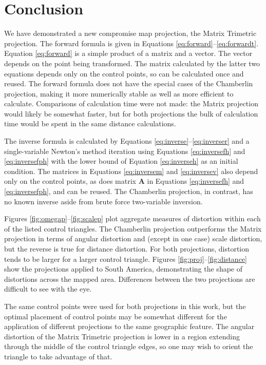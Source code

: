 \documentclass[]{interact}
\begin{document}
\section{Conclusion}
We have demonstrated a new compromise map projection, the Matrix Trimetric
projection. The forward formula is given in Equations
\ref{eq:forward}--\ref{eq:forwardt}. Equation \ref{eq:forward} is a simple
product of a matrix and a vector. The vector depends on the point being
transformed. The matrix calculated by the latter two equations depends only on
the control points, so can be calculated once and reused. The forward formula
does not have the special cases of the Chamberlin projection,
making it more numerically stable as well as more efficient to calculate.
Comparisons of calculation time were not made:
the Matrix projection would likely be somewhat faster, but for both projections
the bulk of calculation time would be spent in the same distance calculations.

The inverse formula is calculated by Equations
\ref{eq:inverse}--\ref{eq:inverser} and a single-variable
Newton's method iteration using Equations \ref{eq:inversefh} and
\ref{eq:inversefph} with the lower bound of Equation \ref{eq:inverseh} as an
initial condition. The matrices in Equations \ref{eq:inversem} and
\ref{eq:inversev} also depend only on the control points, as does matrix
$\mathbf A$ in Equations \ref{eq:inversefh} and \ref{eq:inversefph},
and can be reused. The Chamberlin projection,
in contrast, has no known inverse aside from brute force two-variable inversion.

Figures \ref{fig:omegap}--\ref{fig:scalep} plot aggregate measures of distortion
within each of the listed control triangles. The Chamberlin projection
outperforms the Matrix projection in terms of angular distortion and (except in
one case) scale distortion, but the reverse is true for distance distortion. For
both projections, distortion tends to be larger for a larger control triangle.
Figures \ref{fig:proj}--\ref{fig:distance} show the projections applied to 
South America, demonstrating the shape of distortions across the mapped area.
Differences between the two projections are difficult to see with the eye.

The same control points were used for both projections in this work, but the
optimal placement of control points may be somewhat different for the
application of different projections to the same geographic feature.
The angular distortion of the Matrix Trimetric projection is lower
in a region extending through the middle of the control triangle edges,
so one may wish to orient the triangle to take advantage of that.
\end{document}
